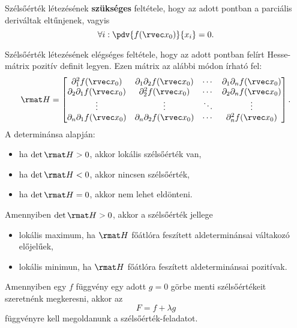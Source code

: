 \documentclass[a4paper, 12pt]{scrartcl}
\begin{document}
\begin{blueBox}

  Szélsőérték létezésének \textbf{szükséges} feltétele, hogy az adott pontban a
  parciális deriváltak eltűnjenek, vagyis
  $$
    \forall i:
    \pdv{f(\rvec x_0)}{x_i} = 0
    \text.
  $$

  Szélsőérték létezésének elégséges feltétele, hogy az adott pontban felírt
  Hesse-mátrix pozitív definit legyen. Ezen mátrix az alábbi módon írható fel:
  $$
    \rmat H = \begin{bmatrix}
      \partial_1^2 f(\rvec x_0)          & \partial_1 \partial_2 f(\rvec x_0) & \cdots & \partial_1 \partial_n f(\rvec x_0) \\
      \partial_2 \partial_1 f(\rvec x_0) & \partial_2^2 f(\rvec x_0)          & \cdots & \partial_2 \partial_n f(\rvec x_0) \\
      \vdots                             & \vdots                             & \ddots & \vdots                             \\
      \partial_n \partial_1 f(\rvec x_0) & \partial_n \partial_2 f(\rvec x_0) & \cdots & \partial_n^2 f(\rvec x_0)
    \end{bmatrix}
    \text.
  $$
  A determinánsa alapján:
  \begin{itemize}
    \item ha $\det \rmat H > 0$, akkor lokális szélsőérték van,
    \item ha $\det \rmat H < 0$, akkor nincsen szélsőérték,
    \item ha $\det \rmat H = 0$, akkor nem lehet eldönteni.
  \end{itemize}
  Amennyiben $\det \rmat H > 0$, akkor a szélsőérték jellege
  \begin{itemize}
    \item lokális maximum, ha $\rmat H$ főátlóra feszített aldeterminánsai
          váltakozó előjelűek,
    \item lokális minimun, ha $\rmat H$ főátlóra feszített aldeterminánsai
          pozitívak.
  \end{itemize}
\end{blueBox}

\begin{blueBox}

  Amennyiben egy $f$ függvény egy adott $g = 0$ görbe menti szélsőértékeit
  szeretnénk megkeresni, akkor az
  $$
    F = f + \lambda g
  $$
  függvényre kell megoldanunk a szélsőérték-feladatot.
\end{blueBox}
\end{document}
